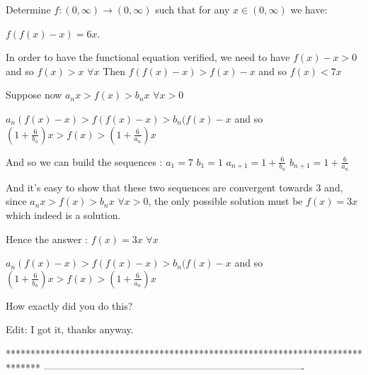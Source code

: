 \begin{solution}
	\begin{tcolorbox}Determine $f:(0, \infty) \rightarrow (0, \infty)$ such that for any $x \in (0, \infty)$ we have:

$f(f(x)-x)=6x$.\end{tcolorbox}
In order to have the functional equation verified, we need to have $f(x)-x>0$ and so $f(x)>x$ $\forall x$
Then $f(f(x)-x)>f(x)-x$ and so $f(x)<7x$

Suppose now $a_nx>f(x)>b_nx$ $\forall x>0$

$a_n(f(x)-x)>f(f(x)-x)>b_n(f(x)-x$ and so $(1+\frac 6{b_n})x>f(x)>(1+\frac 6{a_n})x$

And so we can build the sequences :
$a_1=7$
$b_1=1$
$a_{n+1}=1+\frac 6{b_n}$
$b_{n+1}=1+\frac 6{a_n}$

And it's easy to show that these two sequences are convergent towards $3$ and, since $a_nx>f(x)>b_nx$ $\forall x>0$, the only possible solution must be $f(x)=3x$ which indeed is a solution.

Hence the answer : $\boxed{f(x)=3x}$ $\forall x$
\end{solution}



\begin{solution}
	\begin{tcolorbox}
$a_n(f(x)-x)>f(f(x)-x)>b_n(f(x)-x$ and so $(1+\frac 6{b_n})x>f(x)>(1+\frac 6{a_n})x$
\end{tcolorbox}
How exactly did you do this?

Edit:  I got it, thanks anyway.
\end{solution}



*******************************************************************************
-------------------------------------------------------------------------------

